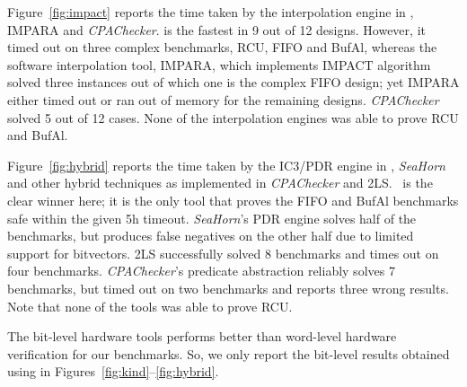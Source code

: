  Figure~\ref{fig:impact} reports
the time taken by the interpolation engine in \ABC, \textsc{IMPARA}
and \emph{CPAChecker}. \ABC is the fastest in 9 out of 12
designs. However, it timed out on three complex benchmarks, RCU, FIFO
and BufAl, whereas the software interpolation tool, \textsc{IMPARA},
which implements IMPACT algorithm solved three instances out of which
one is the complex FIFO design; yet \textsc{IMPARA} either timed out or
ran out of memory for the remaining designs.  \emph{CPAChecker} solved
5 out of 12 cases.  None of the interpolation engines was able to
prove RCU and BufAl.

 Figure~\ref{fig:hybrid}
reports the time taken by the IC3/PDR engine in \ABC, \emph{SeaHorn}
and other hybrid techniques as implemented in \emph{CPAChecker} and
\textsc{2LS}. \ABC~is the clear winner here; it is the only tool that
proves the FIFO and BufAl benchmarks safe within the given 5h timeout.
\emph{SeaHorn}'s PDR engine solves half of the benchmarks, but
produces false negatives on the other half due to limited support for
bitvectors. \textsc{2LS} successfully solved 8 benchmarks and times 
out on four benchmarks.  \emph{CPAChecker}'s predicate abstraction reliably
solves 7 benchmarks, but timed out on two benchmarks and reports three
wrong results. Note that none of the tools was able to prove RCU.

The bit-level hardware tools performs better than word-level hardware 
verification for our benchmarks.  So, we only report the bit-level results 
obtained using \ABC in Figures~\ref{fig:kind}--\ref{fig:hybrid}.



